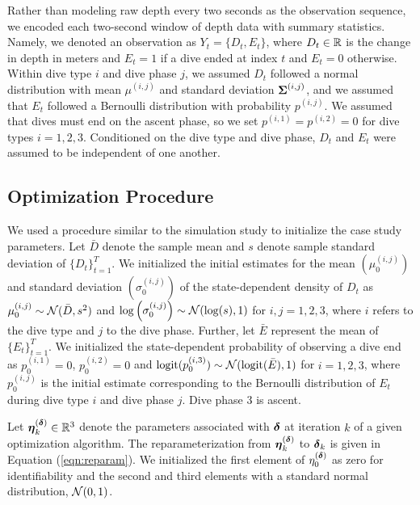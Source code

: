 Rather than modeling raw depth every two seconds as the observation sequence, we encoded each two-second window of depth data with summary statistics. Namely, we denoted an observation as $Y_t = \{D_t,E_t\}$, where $D_t \in \mathbb{R}$ is the change in depth in meters and $E_t = 1$ if a dive ended at index $t$ and $E_t = 0$ otherwise. 
Within dive type $i$ and dive phase $j$, we assumed $D_t$ followed a normal distribution with mean $\mu^{(i,j)}$ and standard deviation $\boldsymbol{\Sigma}^{(i,j)}$, and we assumed that $E_t$ followed a Bernoulli distribution with probability $p^{(i,j)}$. We assumed that dives must end on the ascent phase, so we set $p^{(i,1)} = p^{(i,2)} = 0$ for dive types $i = 1,2,3$. Conditioned on the dive type and dive phase, $D_t$ and $E_t$ were assumed to be independent of one another.

\subsection{Optimization Procedure}

We used a procedure similar to the simulation study to initialize the case study parameters. Let $\bar D$ denote the sample mean and $s$ denote sample standard deviation of $\{D_t\}_{t=1}^T$. We initialized the initial estimates for the mean $\left(\mu^{(i,j)}_0\right)$ and standard deviation $\left(\sigma^{(i,j)}_0\right)$ of the state-dependent density of $D_t$ as
%
    $\mu^{(i,j)}_0 \sim \mathcal{N}(\bar D, s^2)$ and $\log\left(\sigma^{(i,j)}_0\right) \sim \mathcal{N}(\log(s),1)$ for $i,j = 1,2,3$,
%
where $i$ refers to the dive type and $j$ to the dive phase. Further, let $\bar E$ represent the mean of $\{E_t\}_{t=1}^T$. We initialized the state-dependent probability of observing a dive end as
%
    $p^{(i,1)}_0 = 0$, $p^{(i,2)}_0 = 0$ and $\operatorname*{logit}(p^{(i,3)}_0) \sim \mathcal{N}(\operatorname*{logit}(\bar E),1)$ for $i = 1,2,3$,
%
where $p^{(i,j)}_0$ is the initial estimate corresponding to the Bernoulli distribution of $E_t$ during dive type $i$ and dive phase $j$. Dive phase 3 is ascent.

Let $\boldsymbol{\eta}^{(\boldsymbol{\delta})}_k \in \mathbb{R}^3$ denote the parameters associated with $\boldsymbol{\delta}$ at iteration $k$ of a given optimization algorithm. The reparameterization from $\boldsymbol{\eta}^{(\boldsymbol{\delta})}_k$ to $\boldsymbol{\delta}_k$ is given in Equation (\ref{eqn:reparam}). We initialized the first element of $\eta^{(\boldsymbol{\delta})}_0$ as zero for identifiability and the second and third elements with a standard normal distribution, $\mathcal{N}(0,1)$.


